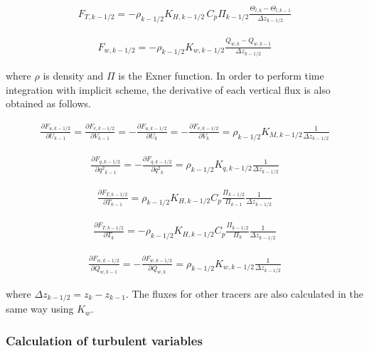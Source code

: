 \begin{eqnarray}F_{T,k-1/2}=-\rho_{k-1/2}K_{H,k-1/2}\,C_p\Pi_{k-1/2}\frac{\Theta_{l,k}-\Theta_{l,k-1}}{\Delta z_{k-1/2}}\end{eqnarray}

\begin{eqnarray}F_{w,k-1/2}=-\rho_{k-1/2}K_{w,k-1/2}\frac{Q_{w,k}-Q_{w,k-1}}{\Delta z_{k-1/2}}\end{eqnarray}

where \(\rho\) is density and \(\Pi\) is the Exner function. In order to
perform time integration with implicit scheme, the derivative of each
vertical flux is also obtained as follows.

\begin{eqnarray}\frac{\partial F_{u,k-1/2}}{\partial U_{k-1}}=\frac{\partial F_{v,k-1/2}}{\partial V_{k-1}}=-\frac{\partial F_{u,k-1/2}}{\partial U_{k}}=-\frac{\partial F_{v,k-1/2}}{\partial V_{k}}=\rho_{k-1/2}K_{M,k-1/2}\frac{1}{\Delta z_{k-1/2}}\end{eqnarray}

\begin{eqnarray}\frac{\partial F_{q,k-1/2}}{\partial {q^2}_ {k-1}}=-\frac{\partial F_{q,k-1/2}}{\partial {q^2}_ {k}}=\rho_{k-1/2}K_{q,k-1/2}\frac{1}{\Delta z_{k-1/2}}\end{eqnarray}

\begin{eqnarray}\frac{\partial F_{T,k-1/2}}{\partial T_{k-1}}=\rho_{k-1/2}K_{H,k-1/2}C_p\frac{\Pi_{k-1/2}}{\Pi_{k-1}}\frac{1}{\Delta z_{k-1/2}}\end{eqnarray}

\begin{eqnarray}\frac{\partial F_{T,k-1/2}}{\partial T_{k}}=-\rho_{k-1/2}K_{H,k-1/2}C_p\frac{\Pi_{k-1/2}}{\Pi_{k}}\frac{1}{\Delta z_{k-1/2}}\end{eqnarray}

\begin{eqnarray}\frac{\partial F_{w,k-1/2}}{\partial Q_{w,k-1}}=-\frac{\partial F_{w,k-1/2}}{\partial Q_{w,k}}=\rho_{k-1/2}K_{w,k-1/2}\frac{1}{\Delta z_{k-1/2}}\end{eqnarray}

where \(\Delta z_{k-1/2}=z_k-z_{k-1}\). The fluxes for other tracers are
also calculated in the same way using \(K_w\).

\hypertarget{calculation-of-turbulent-variables}{%
\subsubsection{Calculation of turbulent
variables}\label{calculation-of-turbulent-variables}}

